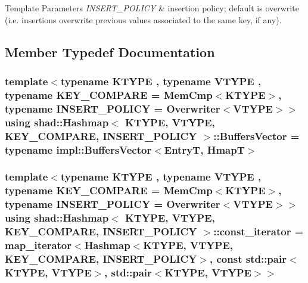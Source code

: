 \begin{DoxyTemplParams}{Template Parameters}
{\em I\-N\-S\-E\-R\-T\-\_\-\-P\-O\-L\-I\-C\-Y} & insertion policy; default is overwrite (i.\-e. insertions overwrite previous values associated to the same key, if any). \\
\hline
\end{DoxyTemplParams}


\subsection{Member Typedef Documentation}
\hypertarget{classshad_1_1Hashmap_abe8958800566729b4fe4b46d0e5d8f70}{
\subsubsection[{Buffers\-Vector}]{\setlength{\rightskip}{0pt plus 5cm}template$<$typename K\-T\-Y\-P\-E , typename V\-T\-Y\-P\-E , typename K\-E\-Y\-\_\-\-C\-O\-M\-P\-A\-R\-E  = Mem\-Cmp$<$\-K\-T\-Y\-P\-E$>$, typename I\-N\-S\-E\-R\-T\-\_\-\-P\-O\-L\-I\-C\-Y  = Overwriter$<$\-V\-T\-Y\-P\-E$>$$>$ using {\bf shad\-::\-Hashmap}$<$ K\-T\-Y\-P\-E, V\-T\-Y\-P\-E, K\-E\-Y\-\_\-\-C\-O\-M\-P\-A\-R\-E, I\-N\-S\-E\-R\-T\-\_\-\-P\-O\-L\-I\-C\-Y $>$\-::{\bf Buffers\-Vector} =  typename impl\-::\-Buffers\-Vector$<${\bf Entry\-T}, {\bf Hmap\-T}$>$}}\label{classshad_1_1Hashmap_abe8958800566729b4fe4b46d0e5d8f70}
\hypertarget{classshad_1_1Hashmap_a1f8a379c42bc2d4b67dcc9f519dc537e}{
\subsubsection[{const\-\_\-iterator}]{\setlength{\rightskip}{0pt plus 5cm}template$<$typename K\-T\-Y\-P\-E , typename V\-T\-Y\-P\-E , typename K\-E\-Y\-\_\-\-C\-O\-M\-P\-A\-R\-E  = Mem\-Cmp$<$\-K\-T\-Y\-P\-E$>$, typename I\-N\-S\-E\-R\-T\-\_\-\-P\-O\-L\-I\-C\-Y  = Overwriter$<$\-V\-T\-Y\-P\-E$>$$>$ using {\bf shad\-::\-Hashmap}$<$ K\-T\-Y\-P\-E, V\-T\-Y\-P\-E, K\-E\-Y\-\_\-\-C\-O\-M\-P\-A\-R\-E, I\-N\-S\-E\-R\-T\-\_\-\-P\-O\-L\-I\-C\-Y $>$\-::{\bf const\-\_\-iterator} =  {\bf map\-\_\-iterator}$<${\bf Hashmap}$<$K\-T\-Y\-P\-E, V\-T\-Y\-P\-E, K\-E\-Y\-\_\-\-C\-O\-M\-P\-A\-R\-E, I\-N\-S\-E\-R\-T\-\_\-\-P\-O\-L\-I\-C\-Y$>$, const std\-::pair$<$K\-T\-Y\-P\-E, V\-T\-Y\-P\-E$>$, std\-::pair$<$K\-T\-Y\-P\-E, V\-T\-Y\-P\-E$>$$>$}}\label{classshad_1_1Hashmap_a1f8a379c42bc2d4b67dcc9f519dc537e}
